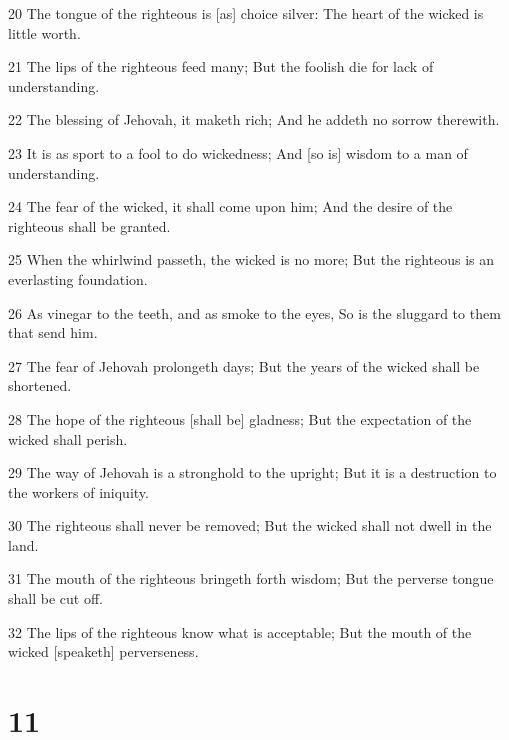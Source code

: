 \par 20 The tongue of the righteous is [as] choice silver: The heart of the wicked is little worth.
\par 21 The lips of the righteous feed many; But the foolish die for lack of understanding.
\par 22 The blessing of Jehovah, it maketh rich; And he addeth no sorrow therewith.
\par 23 It is as sport to a fool to do wickedness; And [so is] wisdom to a man of understanding.
\par 24 The fear of the wicked, it shall come upon him; And the desire of the righteous shall be granted.
\par 25 When the whirlwind passeth, the wicked is no more; But the righteous is an everlasting foundation.
\par 26 As vinegar to the teeth, and as smoke to the eyes, So is the sluggard to them that send him.
\par 27 The fear of Jehovah prolongeth days; But the years of the wicked shall be shortened.
\par 28 The hope of the righteous [shall be] gladness; But the expectation of the wicked shall perish.
\par 29 The way of Jehovah is a stronghold to the upright; But it is a destruction to the workers of iniquity.
\par 30 The righteous shall never be removed; But the wicked shall not dwell in the land.
\par 31 The mouth of the righteous bringeth forth wisdom; But the perverse tongue shall be cut off.
\par 32 The lips of the righteous know what is acceptable; But the mouth of the wicked [speaketh] perverseness.

\chapter{11}

